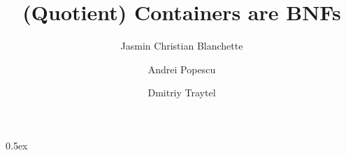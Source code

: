 \documentclass[11pt,a4paper]{article}
\begin{document}
\title{(Quotient) Containers are BNFs}
\author{Jasmin Christian Blanchette \and Andrei Popescu \and Dmitriy Traytel}
\maketitle

\parindent 0pt\parskip 0.5ex


\end{document}
